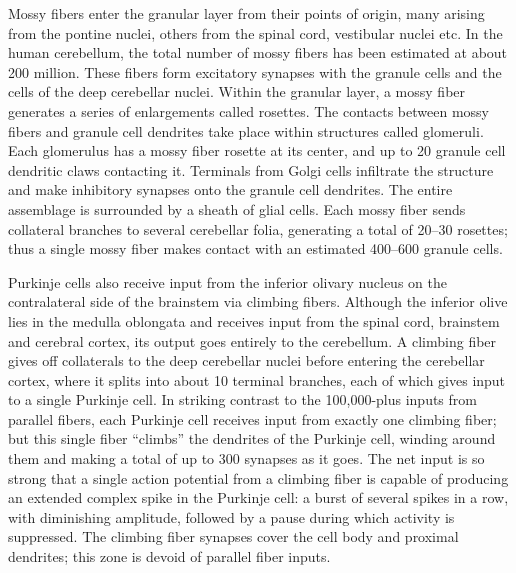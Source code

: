 Mossy fibers enter the granular layer from their points of origin, many arising from the pontine nuclei, others from the spinal cord, vestibular nuclei etc. In the human cerebellum, the total number of mossy fibers has been estimated at about 200 million. These fibers form excitatory synapses with the granule cells and the cells of the deep cerebellar nuclei. Within the granular layer, a mossy fiber generates a series of enlargements called rosettes. The contacts between mossy fibers and granule cell dendrites take place within structures called glomeruli. Each glomerulus has a mossy fiber rosette at its center, and up to 20 granule cell dendritic claws contacting it. Terminals from Golgi cells infiltrate the structure and make inhibitory synapses onto the granule cell dendrites. The entire assemblage is surrounded by a sheath of glial cells. Each mossy fiber sends collateral branches to several cerebellar folia, generating a total of 20--30 rosettes; thus a single mossy fiber makes contact with an estimated 400--600 granule cells.

Purkinje cells also receive input from the inferior olivary nucleus on the contralateral side of the brainstem via climbing fibers. Although the inferior olive lies in the medulla oblongata and receives input from the spinal cord, brainstem and cerebral cortex, its output goes entirely to the cerebellum. A climbing fiber gives off collaterals to the deep cerebellar nuclei before entering the cerebellar cortex, where it splits into about 10 terminal branches, each of which gives input to a single Purkinje cell. In striking contrast to the 100,000-plus inputs from parallel fibers, each Purkinje cell receives input from exactly one climbing fiber; but this single fiber ``climbs'' the dendrites of the Purkinje cell, winding around them and making a total of up to 300 synapses as it goes. The net input is so strong that a single action potential from a climbing fiber is capable of producing an extended complex spike in the Purkinje cell: a burst of several spikes in a row, with diminishing amplitude, followed by a pause during which activity is suppressed. The climbing fiber synapses cover the cell body and proximal dendrites; this zone is devoid of parallel fiber inputs.

